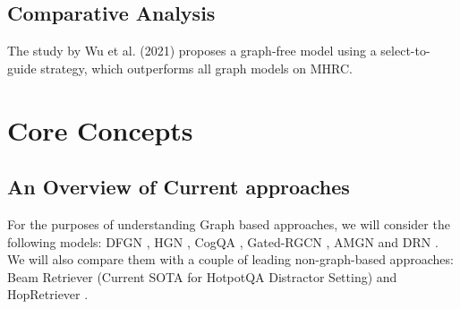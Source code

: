 \documentclass[sigplan,screen]{acmart}
\begin{document}
\subsection{Comparative Analysis}
The study by Wu et al. (2021) \cite{RN106} proposes a graph-free model using a select-to-guide strategy, which outperforms all graph models on MHRC.

\section{Core Concepts}
\subsection{An Overview of Current approaches}
For the purposes of understanding Graph based approaches, we will consider the following models:
DFGN \cite{RN122}, HGN \cite{RN119}, CogQA \cite{RN118}, Gated-RGCN \cite{RN91}, AMGN \cite{RN131} and DRN \cite{RN142}. We will also compare 
them with a couple of leading non-graph-based approaches: Beam Retriever \cite{RN105} (Current SOTA for HotpotQA Distractor Setting) and
HopRetriever \cite{RN149}.
\end{document}

